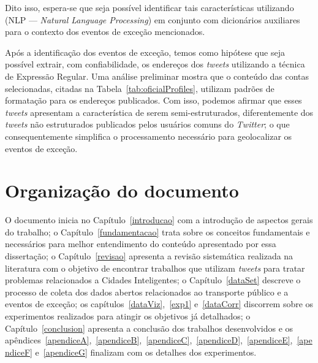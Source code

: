 \documentclass[
	12pt,				%
	oneside,			%
	a4paper,			%
	english,			%
	brazil				%
	]{abntex2ppgsi}
\begin{document}
{\begin{enumerate}
\end{enumerate}

Dito isso, espera-se que seja possível identificar tais características utilizando  (NLP --- \textit{Natural Language Processing}) em conjunto com dicionários auxiliares para o contexto dos eventos de exceção mencionados.

Após a identificação dos eventos de exceção, temos como hipótese que seja possível extrair, com confiabilidade, os endereços dos \textit{tweets} utilizando a técnica de Expressão Regular. Uma análise preliminar mostra que o conteúdo das contas selecionadas, citadas na Tabela~\ref{tab:oficialProfiles}, utilizam padrões de formatação para os endereços publicados. Com isso, podemos afirmar que esses \textit{tweets} apresentam a característica de serem semi-estruturados, diferentemente dos \textit{tweets} não estruturados publicados pelos usuários comuns do \textit{Twitter}; o que consequentemente simplifica o processamento necessário para geolocalizar os eventos de exceção.

\section{Organização do documento}
\label{docOrg}

O  documento inicia no Capítulo~\ref{introducao} com a introdução de aspectos gerais do trabalho; o Capítulo~\ref{fundamentacao} trata sobre os conceitos fundamentais e necessários para melhor entendimento do conteúdo apresentado por essa dissertação; o  Capítulo~\ref{revisao} apresenta a revisão sistemática realizada na literatura com o objetivo de encontrar trabalhos que utilizam \textit{tweets} para tratar problemas relacionados a Cidades Inteligentes; o Capítulo~\ref{dataSet} descreve o processo de coleta dos dados abertos relacionados ao transporte público e a eventos de exceção; os capítulos~\ref{dataViz},~\ref{exp1} e~\ref{dataCorr} discorrem sobre os experimentos realizados para atingir os objetivos já detalhados; o Capítulo~\ref{conclusion} apresenta a conclusão dos trabalhos desenvolvidos e os apêndices~\ref{apendiceA},~\ref{apendiceB},~\ref{apendiceC},~\ref{apendiceD},~\ref{apendiceE},~\ref{apendiceF} e~\ref{apendiceG} finalizam com os detalhes dos experimentos.

}
\end{document}
